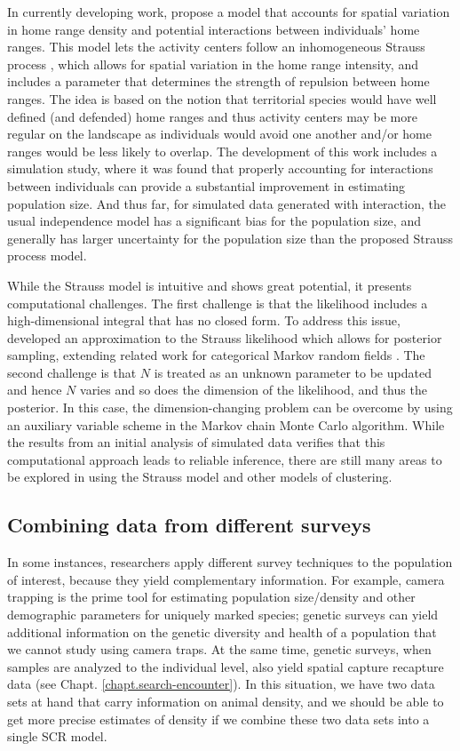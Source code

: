 In currently developing work, \citet{reich_etal:2012} propose a model
that accounts for spatial variation in home range density and
potential interactions between individuals' home ranges. This model
lets the activity centers follow an inhomogeneous Strauss process
\citep{strauss:1975}, which allows for spatial variation in the home
range intensity, and includes a parameter that determines the strength
of repulsion between home ranges. The idea is based on the notion
that territorial species would have well defined (and defended) home
ranges and thus activity centers may be more regular on the landscape
as individuals would avoid one another and/or home ranges would be
less likely to overlap. The development of this work includes a
simulation study, where it was found that properly accounting for
interactions between individuals can provide a substantial improvement
in estimating population size. And thus far, for simulated data
generated with interaction, the usual independence model has a
significant bias for the population size, and generally has larger
uncertainty for the population size than the proposed Strauss process
model.

While the Strauss model is intuitive and shows great potential, it
presents computational challenges. The first challenge is that the
likelihood includes a high-dimensional integral that has no closed
form. To address this issue, \citet{reich_etal:2012} developed an
approximation to the Strauss likelihood which allows for posterior
sampling, extending related work for categorical Markov random fields
\citep{green_richardson:2002,smith_smith:2006}. The second challenge
is that $N$ is treated as an unknown parameter to be updated and hence
$N$ varies and so does the dimension of the likelihood, and thus the
posterior. In this case, the dimension-changing problem can be
overcome by using an auxiliary variable scheme in the Markov chain
Monte Carlo algorithm.
While the results from an initial analysis of simulated data verifies
that this computational approach leads to reliable inference, there
are still many areas to be explored in using the Strauss model and
other models of clustering.


\subsection{Combining data from different surveys}

In some instances, researchers apply different survey techniques to
the population of interest, because they yield complementary
information. For example, camera trapping is the prime tool for
estimating population size/density and other demographic parameters
for uniquely marked species; genetic surveys can yield additional
information on the genetic diversity and health of a population that
we cannot study using camera traps. At the same time, genetic surveys,
when samples are analyzed to the individual level, also yield spatial
capture recapture data (see Chapt. \ref{chapt.search-encounter}). In
this situation, we have two data sets at hand that carry information
on animal density, and we should be able to get more precise estimates
of density if we combine these two data sets into a single SCR model.

